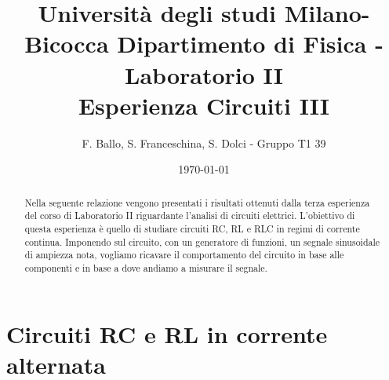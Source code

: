 \documentclass[letterpaper,12pt]{article}
\begin{document}
\title{{\small Università degli studi Milano-Bicocca  Dipartimento di Fisica - Laboratorio II }\\
    Esperienza Circuiti III}
\author{F. Ballo, S. Franceschina, S. Dolci - Gruppo T1 39}
\date{\today}
\maketitle
\thispagestyle{logoheader}


\begin{abstract}
Nella seguente relazione vengono presentati i risultati ottenuti dalla terza esperienza del corso di Laboratorio II riguardante l'analisi di circuiti elettrici. L'obiettivo di questa esperienza è quello di studiare circuiti RC, RL e RLC in regimi di corrente continua. Imponendo sul circuito, con un generatore di funzioni, un segnale sinusoidale di ampiezza nota, vogliamo ricavare il comportamento del circuito in base alle componenti e in base a dove andiamo a misurare il segnale.
\begin{adjustwidth}{-1cm}{-1cm}
\end{adjustwidth}
\end{abstract}
\tableofcontents
\newpage

\section{Circuiti RC e RL in corrente alternata}
\end{document}
